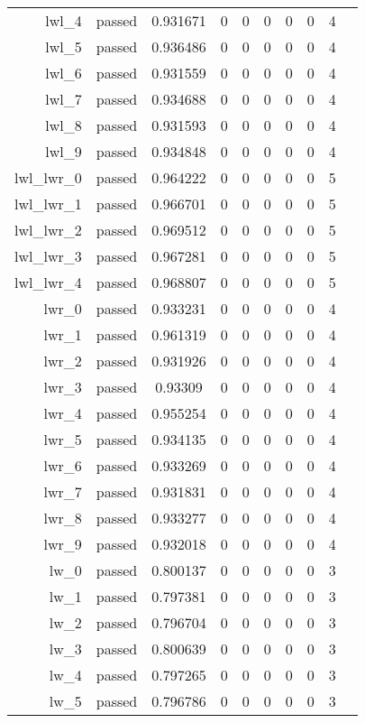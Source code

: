\begin{longtable}{r|ccccccccc}
    lwl\_4 & passed & 0.931671 & 0 & 0 & 0 & 0 & 0 & 4 \\
    lwl\_5 & passed & 0.936486 & 0 & 0 & 0 & 0 & 0 & 4 \\
    lwl\_6 & passed & 0.931559 & 0 & 0 & 0 & 0 & 0 & 4 \\
    lwl\_7 & passed & 0.934688 & 0 & 0 & 0 & 0 & 0 & 4 \\
    lwl\_8 & passed & 0.931593 & 0 & 0 & 0 & 0 & 0 & 4 \\
    lwl\_9 & passed & 0.934848 & 0 & 0 & 0 & 0 & 0 & 4 \\
    lwl\_lwr\_0 & passed & 0.964222 & 0 & 0 & 0 & 0 & 0 & 5 \\
    lwl\_lwr\_1 & passed & 0.966701 & 0 & 0 & 0 & 0 & 0 & 5 \\
    lwl\_lwr\_2 & passed & 0.969512 & 0 & 0 & 0 & 0 & 0 & 5 \\
    lwl\_lwr\_3 & passed & 0.967281 & 0 & 0 & 0 & 0 & 0 & 5 \\
    lwl\_lwr\_4 & passed & 0.968807 & 0 & 0 & 0 & 0 & 0 & 5 \\
    lwr\_0 & passed & 0.933231 & 0 & 0 & 0 & 0 & 0 & 4 \\
    lwr\_1 & passed & 0.961319 & 0 & 0 & 0 & 0 & 0 & 4 \\
    lwr\_2 & passed & 0.931926 & 0 & 0 & 0 & 0 & 0 & 4 \\
    lwr\_3 & passed & 0.93309 & 0 & 0 & 0 & 0 & 0 & 4 \\
    lwr\_4 & passed & 0.955254 & 0 & 0 & 0 & 0 & 0 & 4 \\
    lwr\_5 & passed & 0.934135 & 0 & 0 & 0 & 0 & 0 & 4 \\
    lwr\_6 & passed & 0.933269 & 0 & 0 & 0 & 0 & 0 & 4 \\
    lwr\_7 & passed & 0.931831 & 0 & 0 & 0 & 0 & 0 & 4 \\
    lwr\_8 & passed & 0.933277 & 0 & 0 & 0 & 0 & 0 & 4 \\
    lwr\_9 & passed & 0.932018 & 0 & 0 & 0 & 0 & 0 & 4 \\
    lw\_0 & passed & 0.800137 & 0 & 0 & 0 & 0 & 0 & 3 \\
    lw\_1 & passed & 0.797381 & 0 & 0 & 0 & 0 & 0 & 3 \\
    lw\_2 & passed & 0.796704 & 0 & 0 & 0 & 0 & 0 & 3 \\
    lw\_3 & passed & 0.800639 & 0 & 0 & 0 & 0 & 0 & 3 \\
    lw\_4 & passed & 0.797265 & 0 & 0 & 0 & 0 & 0 & 3 \\
    lw\_5 & passed & 0.796786 & 0 & 0 & 0 & 0 & 0 & 3 \\

\end{longtable}
